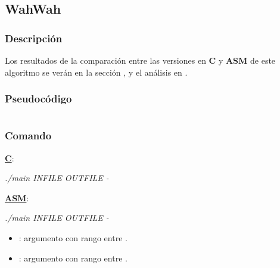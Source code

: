 \subsection{WahWah}
\label{subsec:desarrollo-wahwah}

\subsubsection{Descripción}
\label{subsec:desarrollo-wahwah-desc}


\vspace{\baselineskip}

Los resultados de la comparación entre las versiones en \textbf{C} y \textbf{ASM} de este algoritmo se verán en la sección , y el análisis en .

\subsubsection{Pseudocódigo}
\label{subsec:desarrollo-wahwah-code}

\lstset{language=C}
\begin{lstlisting}[frame=single]
\end{lstlisting}

\subsubsection{Comando}
\label{subsec:desarrollo-wahwah-call}

\underline{\textbf{C}}:
\begin{center}
 \textit{./main INFILE OUTFILE -}
\end{center}

\underline{\textbf{ASM}}:
\begin{center}
 \textit{./main INFILE OUTFILE -}
\end{center}

\begin{itemize}
 \item \textit{}: argumento con rango entre .
 \item \textit{}: argumento con rango entre .
\end{itemize}
 
 
